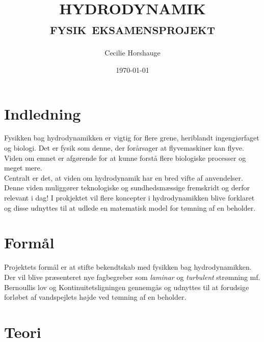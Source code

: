 \documentclass[a4paper, 11pt]{article}
\title{{\large \textsc{HYDRODYNAMIK\\fysik eksamensprojekt}}}
\author{Cecilie Horshauge}
\date{\today}
\begin{document}
\maketitle
\clearpage
\tableofcontents
\clearpage
\section{Indledning}
Fysikken bag hydrodynamikken er vigtig for flere grene, heriblandt ingengiørfaget og biologi.
Det er fysik som denne, der forårsager at flyvemaskiner kan flyve. Viden om emnet er afgørende for at 
kunne forstå flere biologiske processer og meget mere.\\
Centralt er det, at viden om hydrodynamik har en bred vifte af anvendelser. 
Denne viden muliggører teknologiske og sundhedsmæssige fremskridt og derfor relevant i dag!
I prokjektet vil flere koncepter i hydrodynamikken blive forklaret og disse udnyttes til at udlede 
en matematisk model for tømning af en beholder. 

\clearpage
\section{Formål}
Projektets formål er at stifte bekendtskab med fysikken bag hydrodynamikken. 
Der vil blive præsenteret nye fagbegreber som \textit{laminar} og \textit{turbulent} strømning mf. 
Bernoullis lov og Kontinuitetsligningen gennemgås og udnyttes til at forudsige forløbet af vandspejlets højde ved tømning af en beholder.
\section{Teori}
\end{document}
